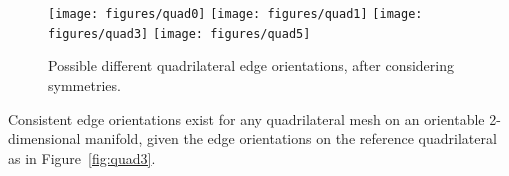 \documentclass[oneeqnum,onethmnum,onefignum,onetabnum]{siamltex1213}
\begin{document}
\begin{figure}
  \centering

  \subcaptionbox{}
    {\texttt{[image: figures/quad0]}}
  \quad
  \subcaptionbox{}
    {\texttt{[image: figures/quad1]}}
  \quad
  \subcaptionbox{\label{fig:quad3}}
    {\texttt{[image: figures/quad3]}}
  \quad
  \subcaptionbox{}
    {\texttt{[image: figures/quad5]}}

  \caption{Possible different quadrilateral edge orientations, after
    considering symmetries.}
  \label{fig:four_quads}
\end{figure}

\begin{theorem}
Consistent edge orientations exist for any quadrilateral mesh on an
orientable 2-dimensional manifold, given the edge orientations on the
reference quadrilateral as in Figure~\ref{fig:quad3}.
\end{theorem}
\end{document}

